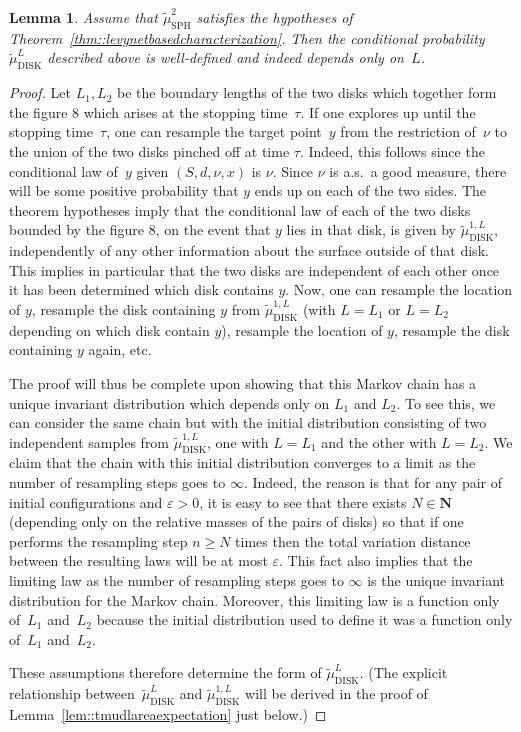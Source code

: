 \documentclass[10pt]{amsart}
\let\epsilon\varepsilon
\theoremstyle{plain}
\numberwithin{theorem}{section}
\newtheorem{lemma}[theorem]{Lemma}
\theoremstyle{definition}
\newcommand{\N}{\mathbf{N}}
\newcommand{\tmustwo}{\wt{\mu}_{\mathrm{SPH}}^2}
\newcommand{\tmudonel}{\wt{\mu}_{ \mathrm{DISK}}^{1, L}}
\newcommand{\tmudl}{\wt{\mu}_{\mathrm{DISK}}^L}
\let\wt\widetilde
\begin{document}
\begin{lemma}
\label{lem::tmudldefined}
Assume that $\tmustwo$ satisfies the hypotheses of Theorem~\ref{thm::levynetbasedcharacterization}. Then the conditional probability $\tmudl$ described above is well-defined and indeed depends only on~$L$.
\end{lemma}
\begin{proof}
Let $L_1,L_2$ be the boundary lengths of the two disks which together form the figure $8$ which arises at the stopping time~$\tau$. If one explores up until the stopping time~$\tau$, one can resample the target point~$y$ from the restriction of~$\nu$ to the union of the two disks pinched off at time $\tau$. Indeed, this follows since the conditional law of~$y$ given $(S,d,\nu,x)$ is $\nu$. Since $\nu$ is a.s.\ a good measure, there will be some positive probability that $y$ ends up on each of the two sides. The theorem hypotheses imply that the conditional law of each of the two disks bounded by the figure $8$, on the event that $y$ lies in that disk, is given by $\tmudonel$, independently of any other information about the surface outside of that disk. This implies in particular that the two disks are independent of each other once it has been determined which disk contains $y$. Now, one can resample the location of $y$, resample the disk containing $y$ from $\tmudonel$ (with $L=L_1$ or $L=L_2$ depending on which disk contain $y$), resample the location of $y$, resample the disk containing $y$ again, etc.

The proof will thus be complete upon showing that this Markov chain has a unique invariant distribution which depends only on $L_1$ and $L_2$. To see this, we can consider the same chain but with the initial distribution consisting of two independent samples from $\tmudonel$, one with $L=L_1$ and the other with $L=L_2$. We claim that the chain with this initial distribution converges to a limit as the number of resampling steps goes to $\infty$. Indeed, the reason is that for any pair of initial configurations and $\epsilon > 0$, it is easy to see that there exists $N \in \N$ (depending only on the relative masses of the pairs of disks) so that if one performs the resampling step $n \geq N$ times then the total variation distance between the resulting laws will be at most $\epsilon$. This fact also implies that the limiting law as the number of resampling steps goes to $\infty$ is the unique invariant distribution for the Markov chain. Moreover, this limiting law is a function only of~$L_1$ and~$L_2$ because the initial distribution used to define it was a function only of~$L_1$ and~$L_2$.

These assumptions therefore determine the form of $\tmudl$. (The explicit relationship between~$\tmudl$ and $\tmudonel$ will be derived in the proof of Lemma~\ref{lem::tmudlareaexpectation} just below.)
\end{proof}
\end{document}
